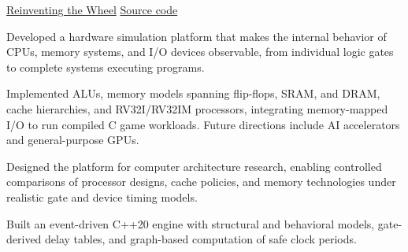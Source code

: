 
\begin{cventries}
  \cventry
    {\href{https://arnold518.github.io/projects/reinventing-the-wheel/}{Reinventing the Wheel}}
    {\href{https://github.com/arnold518/reinventing-the-wheel}{Source code}}
    {
      \begin{cvitems}
        \item {Developed a hardware simulation platform that makes the internal behavior of CPUs, memory systems, and I/O devices observable, from individual logic gates to complete systems executing programs.}
        \item {Implemented ALUs, memory models spanning flip-flops, SRAM, and DRAM, cache hierarchies, and RV32I/RV32IM processors, integrating memory-mapped I/O to run compiled C game workloads. Future directions include AI accelerators and general-purpose GPUs.}
        \item {Designed the platform for computer architecture research, enabling controlled comparisons of processor designs, cache policies, and memory technologies under realistic gate and device timing models.}
        \item {Built an event-driven C++20 engine with structural and behavioral models, gate-derived delay tables, and graph-based computation of safe clock periods.}
      \end{cvitems}
    }
\end{cventries}
